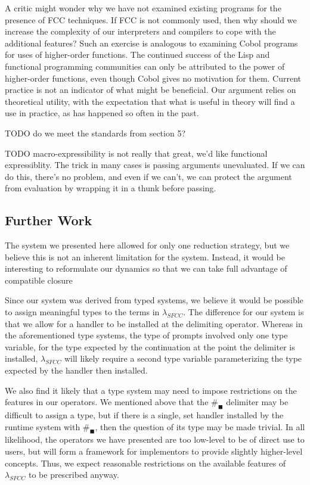 \documentclass[11pt]{article}
\begin{document}
A critic might wonder why we have not examined existing programs for the presence of FCC techniques.
If FCC is not commonly used, then why should we increase the complexity of our interpreters and compilers to cope with the additional features?
Such an exercise is analogous to examining Cobol programs for uses of higher-order functions.
The continued success of the Lisp and functional programming communities can only be attributed to the power of higher-order functions, even though Cobol gives no motivation for them.
Current practice is not an indicator of what might be beneficial.
Our argument relies on theoretical utility, with the expectation that what is useful in theory will find a use in practice, as has happened so often in the past.


TODO do we meet the standards from section 5?

TODO macro-expressibility is not really that great, we'd like functional expressiblity.
The trick in many cases is passing arguments unevaluated. If we can do this, there's no problem, and even if we can't, we can protect the argument from evaluation by wrapping it in a thunk before passing.


\subsection{Further Work}

The system we presented here allowed for only one reduction strategy, but we believe this is not an inherent limitation for the system.
Instead, it would be interesting to reformulate our dynamics so that we can take full advantage of compatible closure\cite{LambdaWithTypes}

Since our system was derived from typed systems\cite{MFDC}\cite{Gunter:1995}, we believe it would be possible to assign meaningful types to the terms in $\lambda_{SFCC}$.
The difference for our system is that we allow for a handler to be installed at the delimiting operator.
Whereas in the aforementioned type systems, the type of prompts involved only one type variable, for the type expected by the continuation at the point the delimiter is installed, $\lambda_{SFCC}$ will likely require a second type variable parameterizing the type expected by the handler then installed.

We also find it likely that a type system may need to impose restrictions on the features in our operators.
We mentioned above that the $\#_\blacksquare$ delimiter may be difficult to assign a type, but if there is a single, set handler installed by the runtime system with $\#_\blacksquare$, then the question of its type may be made trivial.
In all likelihood, the operators we have presented are too low-level to be of direct use to users, but will form a framework for implementors to provide slightly higher-level concepts.
Thus, we expect reasonable restrictions on the available features of $\lambda_{SFCC}$ to be prescribed anyway.
\end{document}
